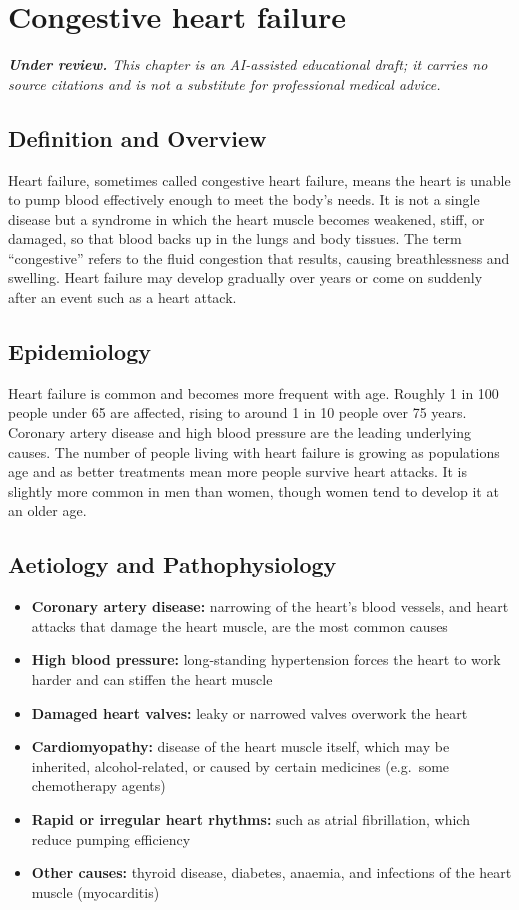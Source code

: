 \chapter{Congestive heart failure}

\medskip
\noindent\textit{\textbf{Under review.} This chapter is an AI-assisted educational draft; it carries no source citations and is not a substitute for professional medical advice.}

\section*{Definition and Overview}
Heart failure, sometimes called congestive heart failure, means the heart is unable to pump blood effectively enough to meet the body's needs. It is not a single disease but a syndrome in which the heart muscle becomes weakened, stiff, or damaged, so that blood backs up in the lungs and body tissues. The term ``congestive'' refers to the fluid congestion that results, causing breathlessness and swelling. Heart failure may develop gradually over years or come on suddenly after an event such as a heart attack.

\section*{Epidemiology}
Heart failure is common and becomes more frequent with age. Roughly 1 in 100 people under 65 are affected, rising to around 1 in 10 people over 75 years. Coronary artery disease and high blood pressure are the leading underlying causes. The number of people living with heart failure is growing as populations age and as better treatments mean more people survive heart attacks. It is slightly more common in men than women, though women tend to develop it at an older age.

\section*{Aetiology and Pathophysiology}
\begin{itemize}
    \item \textbf{Coronary artery disease:} narrowing of the heart's blood vessels, and heart attacks that damage the heart muscle, are the most common causes
    \item \textbf{High blood pressure:} long-standing hypertension forces the heart to work harder and can stiffen the heart muscle
    \item \textbf{Damaged heart valves:} leaky or narrowed valves overwork the heart
    \item \textbf{Cardiomyopathy:} disease of the heart muscle itself, which may be inherited, alcohol-related, or caused by certain medicines (e.g.\ some chemotherapy agents)
    \item \textbf{Rapid or irregular heart rhythms:} such as atrial fibrillation, which reduce pumping efficiency
    \item \textbf{Other causes:} thyroid disease, diabetes, anaemia, and infections of the heart muscle (myocarditis)
\end{itemize}

